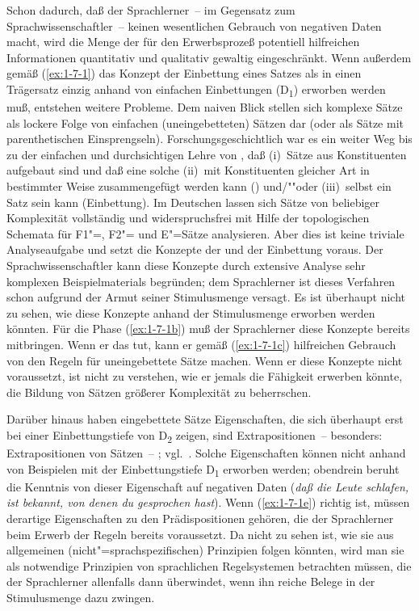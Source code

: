 \documentclass[output=paper]{langsci/langscibook}
\begin{document}
Schon dadurch, daß der Sprachlerner~-- im Gegensatz zum Sprachwissenschaftler~-- keinen wesentlichen Gebrauch von negativen Daten macht, wird die Menge der für
den Erwerbsprozeß potentiell hilfreichen Informationen quantitativ und qualitativ
gewaltig eingeschränkt. Wenn außerdem gemäß (\ref{ex:1-7-1}) das Konzept der Einbettung eines Satzes als  in einen Trägersatz einzig anhand von einfachen Einbettungen (D\textsubscript{1}) erworben werden muß, entstehen weitere Probleme. Dem naiven Blick
stellen sich komplexe Sätze als lockere Folge von einfachen (uneingebetteten) Sätzen
dar (oder als Sätze mit parenthetischen Einsprengseln). Forschungsgeschichtlich war
es ein weiter Weg bis zu der einfachen und durchsichtigen Lehre von \citet{Herling1821T}, daß (i)~Sätze aus Konstituenten aufgebaut sind und daß eine solche 
(ii)~mit Konstituenten gleicher Art in bestimmter Weise zusammengefügt werden
kann () und/""oder (iii)~selbst ein Satz sein kann (Einbettung). Im Deutschen lassen sich Sätze von beliebiger Komplexität vollständig und widerspruchsfrei
mit Hilfe der topologischen Schemata für F1"=, F2"= und E"=Sätze analysieren. Aber dies
ist keine triviale Analyseaufgabe und setzt die Konzepte der  und der
Einbettung voraus. Der Sprachwissenschaftler kann diese Konzepte durch extensive
Analyse sehr komplexen Beispielmaterials begründen; dem Sprachlerner ist dieses
Verfahren schon aufgrund der Armut seiner Stimulusmenge versagt. Es ist überhaupt nicht zu sehen, wie diese Konzepte anhand der Stimulusmenge erworben
werden könnten. Für die Phase (\ref{ex:1-7-1b}) muß der Sprachlerner diese Konzepte bereits
mitbringen. Wenn er das tut, kann er gemäß (\ref{ex:1-7-1c}) hilfreichen Gebrauch von den Regeln für uneingebettete Sätze machen. Wenn er diese Konzepte nicht voraussetzt, ist
nicht zu verstehen, wie er jemals die Fähigkeit erwerben könnte, die Bildung von
Sätzen größerer Komplexität zu beherrschen.

Darüber hinaus haben eingebettete Sätze Eigenschaften, die sich überhaupt erst
bei einer Einbettungstiefe von D\textsubscript{2} zeigen, \zb sind Extrapositionen~-- besonders: Extrapositionen von Sätzen~– ; vgl.\ \citet{Hoehle80}. Solche Eigenschaften können nicht anhand von Beispielen mit der Einbettungstiefe D\textsubscript{1} erworben
werden; obendrein beruht die Kenntnis von dieser Eigenschaft auf negativen Daten
(\zb *\textit{daß die Leute schlafen, ist bekannt, von denen du gesprochen hast}). Wenn
(\ref{ex:1-7-1e}) richtig ist, müssen derartige Eigenschaften zu den Prädispositionen gehören, die
der Sprachlerner beim Erwerb der Regeln bereits voraussetzt. Da nicht zu sehen ist,
wie sie aus allgemeinen (nicht"=sprachspezifischen) Prinzipien folgen könnten, wird
man sie als notwendige Prinzipien von sprachlichen Regelsystemen betrachten müssen, die der Sprachlerner allenfalls dann überwindet, wenn ihn reiche Belege in der
Stimulusmenge dazu zwingen.
\end{document}
